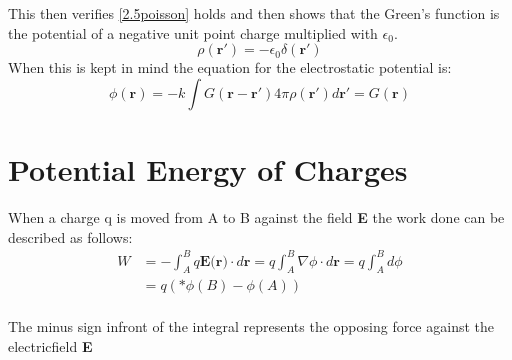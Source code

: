 \noindent This then verifies \ref{2.5poisson} holds and then shows that the Green's function is the potential of a negative unit point charge multiplied with $\epsilon_0$.
\begin{equation}
    \rho(\textbf{r}') = -\epsilon_0 \delta(\textbf{r}')
\end{equation}
When this is kept in mind the equation for the electrostatic potential is:
\begin{equation}
    \phi(\textbf{r})= -k \int G(\textbf{r}-\textbf{r}')4 \pi \rho(\textbf{r}') d \textbf{r}' = G(\textbf{r})
\end{equation}
\section{Potential Energy of Charges}
When a charge q is moved from A to B against the field \textbf{E} the work done can be described as follows:
\begin{equation}
    \begin{aligned}
        W &= - \int_A^B q\textbf{E(r)} \cdot d\textbf{r} = q\int_A^B \nabla\phi \cdot d\textbf{r} =  q\int_A^B d\phi \\    
          &= q(*\phi(B)-\phi(A))\\
    \end{aligned}
\end{equation}

\noindent The minus sign infront of the integral represents the opposing force against the electricfield \textbf{E} 
